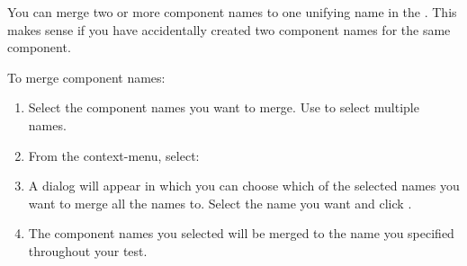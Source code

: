
You can merge two or more component names to one unifying name in the %
\gdcompnamebrowser{}. This makes sense if you have accidentally created two component names for the same component. 


To merge component names:
\begin{enumerate}
\item Select the component names you want to merge. Use  to select multiple names. 
\item From the context-menu, select:\\
\item A dialog will appear in which you can choose which of the selected names you want to merge all the names to. Select the name you want and click . 
\item The component names you selected will be merged to the name you specified throughout your test. 
\end{enumerate}
